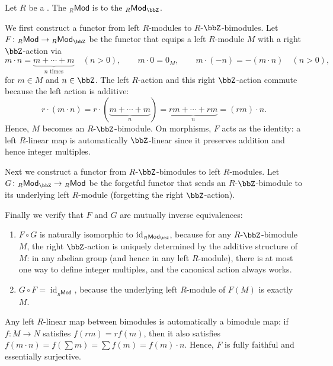 \begin{proposition} \label{proposition:category_of_left_R_modules_is_equivalent_to_R_Z_bimodules}
    Let $R$ be a . The  ${}_R\mathsf{Mod}$ is  to the  ${}_R\mathsf{Mod}_\bbZ$.

    We first construct a functor from left $R$-modules to $R$-$\bbZ$-bimodules. Let $F \colon {}_R\mathsf{Mod} \to {}_R\mathsf{Mod}_\bbZ$ be the functor that equips a left $R$-module $M$ with a right $\bbZ$-action via
    $$m \cdot n = \underbrace{m + \cdots + m}_{n \text{ times}} \quad (n > 0), \qquad m \cdot 0 = 0_M, \qquad m \cdot (-n) = -(m \cdot n) \quad (n > 0),$$
    for $m \in M$ and $n \in \bbZ$. The left $R$-action and this right $\bbZ$-action commute because the left action is additive:
    $$r \cdot (m \cdot n) = r \cdot (\underbrace{m + \cdots + m}_{n}) = \underbrace{rm + \cdots + rm}_{n} = (rm) \cdot n.$$
    Hence, $M$ becomes an $R$-$\bbZ$-bimodule. On morphisms, $F$ acts as the identity: a left $R$-linear map is automatically $\bbZ$-linear since it preserves addition and hence integer multiples.

    Next we construct a functor from $R$-$\bbZ$-bimodules to left $R$-modules. Let $G \colon {}_R\mathsf{Mod}_\bbZ \to {}_R\mathsf{Mod}$ be the forgetful functor that sends an $R$-$\bbZ$-bimodule to its underlying left $R$-module (forgetting the right $\bbZ$-action).

    Finally we verify that $F$ and $G$ are mutually inverse equivalences:
    \begin{enumerate}
        \item $F \circ G$ is naturally isomorphic to $\operatorname{id}_{{}_R\mathsf{Mod}_\bbZ}$, because for any $R$-$\bbZ$-bimodule $M$, the right $\bbZ$-action is uniquely determined by the additive structure of $M$: in any abelian group (and hence in any left $R$-module), there is at most one way to define integer multiples, and the canonical action always works.
        \item $G \circ F = \operatorname{id}_{{}_R\mathsf{Mod}}$, because the underlying left $R$-module of $F(M)$ is exactly $M$.
    \end{enumerate}
    Any left $R$-linear map between bimodules is automatically a bimodule map: if $f \colon M \to N$ satisfies $f(rm) = rf(m)$, then it also satisfies $f(m \cdot n) = f(\sum m) = \sum f(m) = f(m) \cdot n$. Hence, $F$ is fully faithful and essentially surjective.
\end{proposition}
